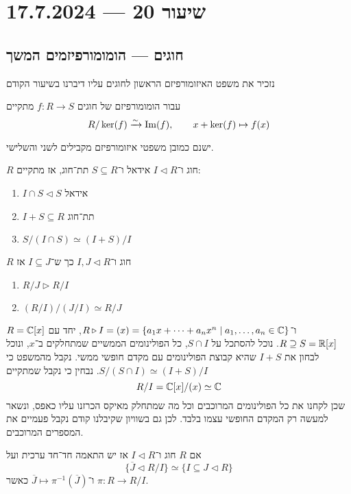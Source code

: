 \section{שיעור 20 --- 17.7.2024}
\subsection{חוגים --- הומומורפיזמים המשך}
נזכיר את משפט האיזומורפיזם הראשון לחוגים עליו דיברנו בשיעור הקודם
\begin{theorem}
	עבור הומומורפיזם של חוגים $f : R \to S$ מתקיים
	\[
		R / \ker(f) \xrightarrow{\sim} \operatorname{Im}(f),
		\qquad
		x + \ker(f) \mapsto f(x)
	\]
\end{theorem}
ישנם כמובן משפטי איזומורפיזם מקבילים לשני והשלישי.
\begin{theorem}
	$R$ חוג ו־$I \triangleleft R$ אידאל ו־$S \subseteq R$ תת־חוג, אז מתקיים:
	\begin{enumerate}
		\item $I \cap S \triangleleft S$ אידאל
		\item $I + S \subseteq R$ תת־חוג
		\item $S / (I \cap S) \simeq (I + S) / I$
	\end{enumerate}
\end{theorem}
\begin{theorem}
	$R$ חוג ו־$I, J \triangleleft R$ כך ש־$I \subseteq J$ אז
	\begin{enumerate}
		\item $R / J \triangleright R / I$
		\item $(R / I) / (J / I) \simeq R / J$
	\end{enumerate}
\end{theorem}
\begin{example}
	$R = \mathbb{C}[x]$ ו־$R \triangleright I = (x) = \{ a_1 x + \cdots + a_n x^n \mid a_1, \dots, a_n \in \mathbb{C} \}$, יחד עם $R \supseteq S = \mathbb{R}[x]$.
	נוכל להסתכל על $S \cap I$, כל הפולינומים הממשיים שמתחלקים ב־$x$, ונוכל לבחון את $I + S$ שהיא קבוצת הפולינומים עם מקדם חופשי ממשי.
	נקבל מהמשפט כי $S / (S \cap I) \simeq (I + S) / I$.
	נבחין כי נקבל שמתקיים
	\[
		R / I = \mathbb{C}[x] / (x) \simeq \mathbb{C}
	\]
	שכן לקחנו את כל הפולינומים המרוכבים וכל מה שמתחלק מאיקס הכרזנו עליו כאפס, ונשאר למעשה רק המקדם החופשי עצמו בלבד.
	לכן גם בשוויון שקיבלנו קודם נקבל פעמיים את המספרים המרוכבים.
\end{example}
\begin{theorem}
	אם $R$ חוג ו־$I \triangleleft R$ אז יש התאמה חד־חד ערכית ועל
	\[
		\{ \overline{J} \triangleleft R / I \} \simeq \{ I \subseteq J \triangleleft R \}
	\]
	ו־$\overline{J} \mapsto \pi^{-1}(\overline{J})$ כאשר $\pi : R \to R / I$.
\end{theorem}
